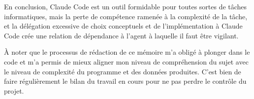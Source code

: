 En conclusion, Claude Code est un outil formidable pour toutes sortes de tâches informatiques,
mais la perte de compétence ramenée à la complexité de la tâche, et la délégation excessive de
choix conceptuels et de l'implémentation à Claude Code crée une relation de dépendance à l'agent
à laquelle il faut être vigilant.

À noter que le processus de rédaction de ce mémoire m'a obligé à plonger dans le code et m'a
permis de mieux aligner mon niveau de compréhension du sujet avec le niveau de complexité du
programme et des données produites. C'est bien de faire régulièrement le bilan du travail
en cours pour ne pas perdre le contrôle du projet.
